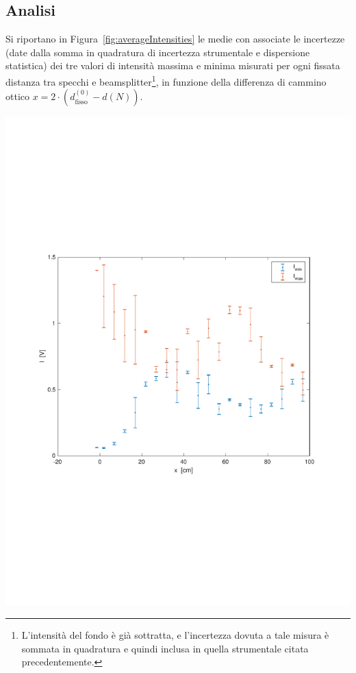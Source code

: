\documentclass[10pt,oneside,a4paper]{article}
\newenvironment{Figure}
  {\par\medskip\noindent\minipage{\linewidth}}
  {\endminipage\par\medskip}
\begin{document}
\begin{multicols}{2}
\subsection{Analisi}
Si riportano in Figura~\ref{fig:averageIntensities} le medie con associate le incertezze (date dalla somma in quadratura di incertezza strumentale e dispersione statistica) dei tre valori di intensità massima e minima misurati per ogni fissata distanza tra specchi e beamsplitter\footnote{L'intensità del fondo è già sottratta, e l'incertezza dovuta a tale misura è sommata in quadratura e quindi inclusa in quella strumentale citata precedentemente.}, in funzione della differenza di cammino ottico $x = 2\cdot \left(d^{(0)}_\mathrm{fisso} - d(N)\right)$.

\begin{Figure}
	\begin{center}
	\includegraphics[width=\linewidth]{<Imax-min>_vs_tau.pdf}
	\label{fig:averageIntensities}
	\end{center}
\end{Figure}


\end{multicols}
\end{document}
